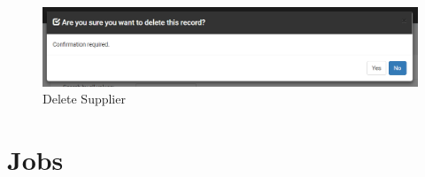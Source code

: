 \documentclass[a4paper,11pt,twoside]{report}
\theoremstyle{definition}
\begin{document}
\begin{enumerate}
\begin{figure}[h!]
\begin{center}
\includegraphics[width=\textwidth]{AS/supplier/5}
\end{center}
\caption{Delete Supplier}
\end{figure}

\end{enumerate}



\section{Jobs}
\end{document}
